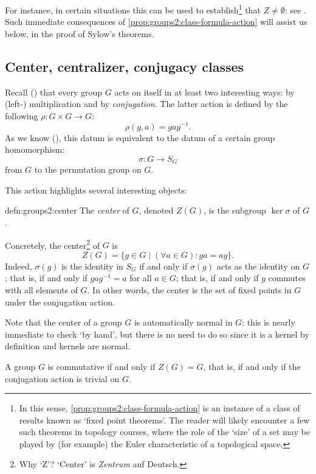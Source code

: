 For instance, in certain situations this can be used to
establish\footnote{In this sense,
  \cref{prop:groups2:class-formula-action} is an instance of a class
  of results known as `fixed point theorems'. The reader will likely
  encounter a few such theorems in topology courses, where the role of
  the `size' of a set may be played by (for example) the Euler
  characteristic of a topological space.} that $Z \neq \emptyset$: see
. Such immediate
consequences of \cref{prop:groups2:class-formula-action} will assist
us below, in the proof of Sylow's theorems.

\subsection{Center, centralizer, conjugacy classes}
\label{subsec:groups2:center-centralizer-conjugacy-classes}
Recall ()
that every group $G$ acts on itself in at least two interesting ways:
by (left-) multiplication and by \emph{conjugation}. The latter action
is defined by the following $\rho : G \times G \to G$:
\[
  \rho(g, a) = gag^{-1}.
\]
As we know (), this datum is
equivalent to the datum of a certain group homomorphism:
\[
  \sigma : G \to S_G
\]
from $G$ to the permutation group on $G$.

This action highlights several interesting objects:

\begin{defn}{}{defn:groups2:center}
  The \emph{center} of $G$, denoted $Z(G)$, is the subgroup
  $\ker\sigma$ of $G$.
\end{defn}

Concretely, the center\footnote{Why `Z'? `Center' is \emph{Zentrum}
  auf Deutsch.} of $G$ is
\[
  Z(G) = \{g \in G \mid (\forall a \in G) : ga = ag\}.
\]
Indeed, $\sigma(g)$ is the identity in $S_G$ if and only if
$\sigma(g)$ acts as the identity on $G$; that is, if and only if
$gag^{-1} = a$ for all $a \in G$; that is, if and only if $g$ commutes
with all elements of $G$. In other words, the center is the set of
fixed points in $G$ under the conjugation action.

Note that the center of a group $G$ is automatically normal in $G$:
this is nearly immediate to check `by hand', but there is no need to
do so since it is a kernel by definition and kernels are normal.

A group $G$ is commutative if and only if $Z(G) = G$, that is, if and
only if the conjugation action is trivial on $G$.

